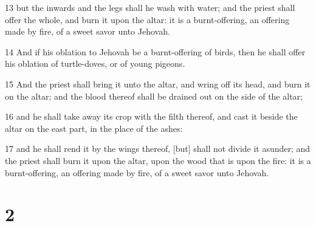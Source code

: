 \par 13 but the inwards and the legs shall he wash with water; and the priest shall offer the whole, and burn it upon the altar: it is a burnt-offering, an offering made by fire, of a sweet savor unto Jehovah.
\par 14 And if his oblation to Jehovah be a burnt-offering of birds, then he shall offer his oblation of turtle-doves, or of young pigeons.
\par 15 And the priest shall bring it unto the altar, and wring off its head, and burn it on the altar; and the blood thereof shall be drained out on the side of the altar;
\par 16 and he shall take away its crop with the filth thereof, and cast it beside the altar on the east part, in the place of the ashes:
\par 17 and he shall rend it by the wings thereof, [but] shall not divide it asunder; and the priest shall burn it upon the altar, upon the wood that is upon the fire: it is a burnt-offering, an offering made by fire, of a sweet savor unto Jehovah.

\chapter{2}

